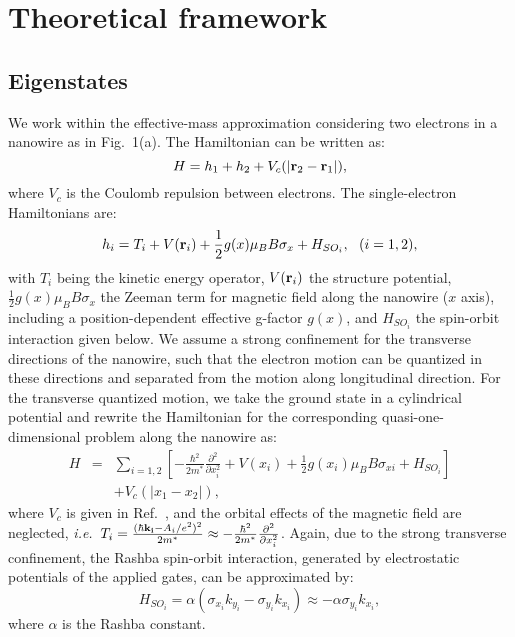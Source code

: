 \documentclass[prb,twocolumn,showpacs,floats]{revtex4}
\begin{document}
 


\section{Theoretical framework}

\subsection{Eigenstates}
\label{sec-eigen}

We work within the effective-mass approximation considering two electrons in a nanowire
as in Fig.~1(a).
The Hamiltonian can be written as:\cite{szafram}
\begin{equation}
H=h_1 + h_2 + V_c(| {\bf r}_{2}  - {\bf r}_{1}  | ),
\end{equation}
where $V_c$ is the Coulomb repulsion between electrons. The single-electron Hamiltonians are:
\begin{equation}
h_i = T_i + V({\bf r}_i ) + \frac{1}{2} g(x) \mu_B B \sigma_x 
+H_{SO_i},   ~~(i=1, 2),
\end{equation}
with $T_i$ being the kinetic energy operator,
 $V({\bf r}_i )$  the structure potential, $\frac{1}{2} g(x) \mu_B B \sigma_x $
the Zeeman term for magnetic field along the nanowire ($x$ axis), including a position-dependent effective
g-factor $g(x)$,\cite{petta-prl} and $H_{SO_i}$ the spin-orbit interaction given below.
We assume a strong confinement for the transverse directions of the nanowire, such that the electron motion
can be quantized in these directions and separated from the motion along longitudinal direction.
For the transverse quantized motion, we take\cite{szafram}
the ground state in a cylindrical potential and rewrite the Hamiltonian for the corresponding quasi-one-dimensional
problem along the nanowire as:\cite{szafram}
\begin{eqnarray} 
H &=& \sum_{i=1,2} [ -\frac{\hbar^2 }{2 m^*}\frac{\partial^2 }{\partial x_i^2} + V(x_i) + 
\frac{1}{2} g(x_i) \mu_B B \sigma_{xi} 
+H_{SO_i} ]    \nonumber \\ &&
+ V_c(|x_1 - x_2|),
\label{Hx}
\end{eqnarray}
where $V_c$ is given in Ref.~, and the orbital effects of the magnetic field are neglected, 
\textit{i.e.}~$T_i=\frac{ ( \hbar {\bf k_i} -A_i/e^2)^2 }{2 m^*} \approx -\frac{\hbar^2 }{2 m^*}\frac{\partial^2 }{\partial x_i^2}$.
 Again, due to the strong transverse confinement, the Rashba
spin-orbit interaction, generated by electrostatic potentials of the applied gates, can be approximated
by:\cite{szafram}
\begin{equation}
H_{SO_i}=\alpha (\sigma_{x_i} k_{y_i}- \sigma_{y_i} k_{x_i})
 \approx -\alpha   \sigma_{y_i} k_{x_i},
\label{HSO}
\end{equation}
where $\alpha$ is the Rashba constant. 
\end{document}
